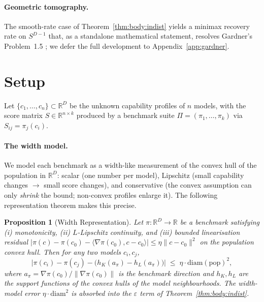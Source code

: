 \documentclass{article}
\newtheorem{proposition}{Proposition}
\begin{document}
\paragraph{Geometric tomography.}
The smooth-rate case of Theorem~\ref{thm:body:indist} yields a
minimax recovery rate on $S^{D-1}$ that, as a standalone
mathematical statement, resolves Gardner's Problem~1.5
\citep{gardner1995geometric, gardner2006geometric}; we defer the
full development to Appendix~\ref{app:gardner}.

\section{Setup}

Let $\{c_1, \ldots, c_n\} \subset \mathbb{R}^D$ be the unknown
capability profiles of $n$ models, with the score matrix $S \in
\mathbb{R}^{n \times k}$ produced by a benchmark suite $\Pi = (\pi_1,
\ldots, \pi_k)$ via $S_{ij} = \pi_j(c_i)$.

\paragraph{The width model.}
We model each benchmark as a width-like measurement of the convex hull
of the population in $\mathbb{R}^D$: scalar (one number per model),
Lipschitz (small capability changes $\to$ small score changes), and
conservative (the convex assumption can only \emph{shrink} the bound;
non-convex profiles enlarge it). The following representation
theorem makes this precise.

\begin{proposition}[Width Representation]
\label{prop:body:width}
Let $\pi : \mathbb{R}^D \to \mathbb{R}$ be a benchmark satisfying
(i) monotonicity, (ii) $L$-Lipschitz continuity, and (iii) bounded
linearisation residual $|\pi(c) - \pi(c_0) - \langle \nabla
\pi(c_0), c - c_0\rangle| \le \eta \|c - c_0\|^2$ on the population
convex hull. Then for any two models $c_i, c_j$,
\begin{equation}
\label{eq:width}
  \big| \pi(c_i) - \pi(c_j) - \big( h_K(a_\pi) - h_L(a_\pi) \big) \big|
  \;\le\; \eta \cdot \mathrm{diam}(\mathrm{pop})^2,
\end{equation}
where $a_\pi = \nabla \pi(c_0)/\|\nabla \pi(c_0)\|$ is the benchmark
direction and $h_K, h_L$ are the support functions of the convex hulls
of the model neighbourhoods. The width-model error $\eta \cdot
\mathrm{diam}^2$ is absorbed into the $\varepsilon$ term of
Theorem~\ref{thm:body:indist}.
\end{proposition}
\end{document}

